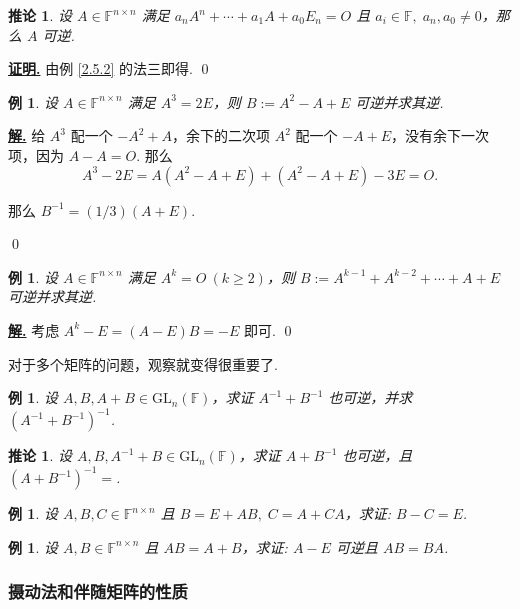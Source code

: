 \documentclass[10pt,openany]{article}
\theoremstyle{thmstyle} %
\theoremstyle{defstyle} %
\newtheorem{corollary}[theorem]{推论}
\theoremstyle{prostyle} %
\theoremstyle{exastyle}
\newtheorem{example}[theorem]{例}
\theoremstyle{remstyle}
\renewenvironment{proof}[1][证明]{\par\underline{\textbf{#1.}} \;\fangsong}{\qed\par}
\newenvironment{solution}{\par\underline{\textbf{解.}} \;\fangsong}{\qed\par}
\newcommand{\F}{\mathbb{F}}
\newcommand{\gf}{\text{GL}_n(\mathbb{F})}
\newcommand{\n}{^{n \times n}}
\begin{document}
\begin{corollary}
	设 \(  A \in \F\n \) 满足 \( a_nA^n+\cdots+a_1A+a_0E_n=O \) 且 \( a_i \in \F, \; a_n,a_0 \neq 0 \)，那么 \( A \) 可逆.
\end{corollary}

\begin{proof}
	由例 \ref{2.5.2} 的法三即得.
\end{proof}

\begin{example}
	设 \(  A \in \F\n \) 满足 \( A^3=2E \)，则 \( B:=A^2-A+E \) 可逆并求其逆.
\end{example}

\begin{solution}
     给 \( A^3 \) 配一个 \( -A^2+A \)，余下的二次项 \( A^2 \) 配一个 \( -A+E \)，没有余下一次项，因为 \( A-A=O \). 那么
     \[ A^3-2E=A(A^2-A+E)+(A^2-A+E)-3E=O. \]
     
     那么 \( B^{-1}=(1/3) (A+E) \).
	
\end{solution}

\begin{example}
	设 \(  A \in \F\n \) 满足 \( A^k=O \ (k \geq 2) \)，则 \( B:=A^{k-1}+A^{k-2}+\cdots+A+E \) 可逆并求其逆.
\end{example}

\begin{solution}
	考虑 \( A^k-E=(A-E)B=-E \) 即可.
\end{solution}


对于多个矩阵的问题，观察就变得很重要了.

\begin{example}
	设 \( A,B, A+B \in \gf \)，求证 \( A^{-1}+B^{-1} \) 也可逆，并求 \( (A^{-1}+B^{-1})^{-1} \).
\end{example}

\begin{corollary}
	设 \( A,B, A^{-1}+B \in \gf \)，求证 \( A+B^{-1} \) 也可逆，且 \( (A+B^{-1})^{-1}= \).
\end{corollary}

\begin{example}
	设 \( A,B,C \in \F\n \) 且 \( B=E+AB, \; C=A+CA \)，求证: \( B-C=E \).
\end{example}

\begin{example}
	设 \( A,B \in \F\n \) 且 \( AB=A+B \)，求证: \( A-E \) 可逆且 \( AB=BA \).
\end{example}

\subsubsection{摄动法和伴随矩阵的性质}
\end{document}
